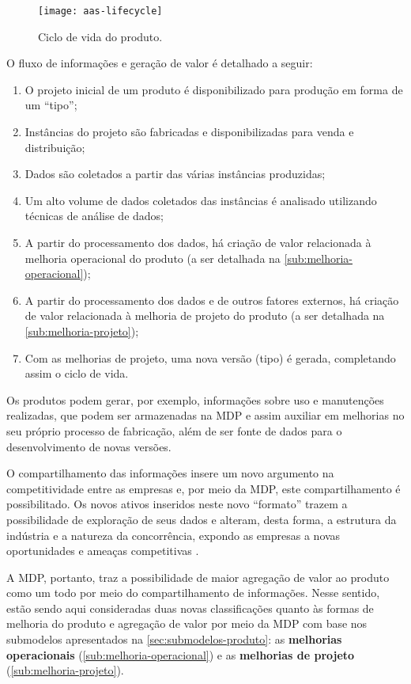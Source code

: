 \begin{figure}[htb]
	\centering
	\texttt{[image: aas-lifecycle]}
	\caption{Ciclo de vida do produto.}
	\label{fig:aas-lifecycle}
\end{figure}

O fluxo de informações e geração de valor é detalhado a seguir:

\begin{enumerate}[label=(\alph*)]
	\item O projeto inicial de um produto é disponibilizado para produção em forma de um ``tipo'';
	\item Instâncias do projeto são fabricadas e disponibilizadas para venda e distribuição;
	\item Dados são coletados a partir das várias instâncias produzidas;
	\item Um alto volume de dados coletados das instâncias é analisado utilizando técnicas de análise de dados;
	\item A partir do processamento dos dados, há criação de valor relacionada à melhoria operacional do produto (a ser detalhada na \autoref{sub:melhoria-operacional});
	\item A partir do processamento dos dados e de outros fatores externos, há criação de valor relacionada à melhoria de projeto do produto (a ser detalhada na \autoref{sub:melhoria-projeto});
	\item Com as melhorias de projeto, uma nova versão (tipo) é gerada, completando assim o ciclo de vida.
\end{enumerate}

Os produtos podem gerar, por exemplo, informações sobre uso e manutenções realizadas, que podem ser armazenadas na MDP e assim auxiliar em melhorias no seu próprio processo de fabricação, além de ser fonte de dados para o desenvolvimento de novas versões.

O compartilhamento das informações insere um novo argumento na competitividade entre as empresas \cite{framling2013plm} e, por meio da MDP, este compartilhamento é possibilitado. Os novos ativos inseridos neste novo ``formato'' trazem a possibilidade de exploração de seus dados e alteram, desta forma, a estrutura da indústria e a natureza da concorrência, expondo as empresas a novas oportunidades e ameaças competitivas \cite{porter2015smartproducts}.

A MDP, portanto, traz a possibilidade de maior agregação de valor ao produto como um todo por meio do compartilhamento de informações. Nesse sentido, estão sendo aqui consideradas duas novas classificações quanto às formas de melhoria do produto e agregação de valor por meio da MDP com base nos submodelos apresentados na \autoref{sec:submodelos-produto}: as \textbf{melhorias operacionais} (\autoref{sub:melhoria-operacional}) e as \textbf{melhorias de projeto} (\autoref{sub:melhoria-projeto}).

